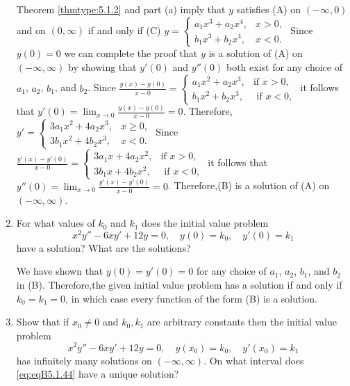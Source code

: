 \documentclass{ximera}
\begin{document}
\begin{problem}
\begin{enumerate}
\begin{solution}
    Theorem \ref{thmtype:5.1.2} and part (a) imply that $y$ satisfies (A) on
$(-\infty,0)$ and on $(0,\infty)$ if and only if
(C) $y=\left\{\begin{array}{rr}
a_1x^3+a_2x^4,&x> 0,\\
b_1x^3+b_2x^4,&x<0.
\end{array}\right.$
Since $y(0)=0$ we can  complete the proof that $y$ is
a solution of
(A) on $(-\infty,\infty)$ by showing
that $y'(0)$ and $y''(0)$ both exist for any choice of $a_1$, $a_2$,
$b_1$, and $b_2$. Since
$\frac{y(x)-y(0)}{
x-0}=\left\{\begin{array}{cl}a_1x^2+a_2x^3,&\mbox{
if }x>0,\\ b_1x^2+b_2x^3,&\mbox{ if }x<0,\end{array}\right.$ it
follows
that $y'(0)=\lim_{x\to0}\frac{y(x)-y(0)}{ x-0}=0$. Therefore,
$y'=\left\{\begin{array}{rr}
3a_1x^2+4a_2x^3,&x\ge 0,\\
3b_1x^2+4b_2x^3,&x<0.
\end{array}\right.$
Since
$\frac{y'(x)-y'(0)}{
x-0}=\left\{\begin{array}{cl}3a_1x+4a_2x^2,&\mbox{
if }x>0,\\ 3b_1x+4b_2x^2,&\mbox{ if }x<0,\end{array}\right.$ it
follows that $y''(0)=\lim_{x\to0}\frac{y'(x)-y'(0)}{ x-0}=0$.
Therefore,(B) is a solution of (A) on $(-\infty,\infty)$.
\end{solution}
\item %
 For what values of $k_0$ and  $k_1$
does the initial value problem
$$
x^2y''-6xy'+12y=0, \quad  y(0)=k_0,\quad y'(0)=k_1
$$
have a solution? What are the solutions?

\begin{solution}
    We have shown that $y(0)=y'(0)=0$ for any choice
of $a_1$, $a_2$, $b_1$, and $b_2$ in (B). Therefore,the given initial
value
problem has a solution if and only if $k_0=k_1=0$, in which case every
function of the form (B) is a solution.
\end{solution}
\item %
 Show that if $x_0\ne0$ and $k_0,k_1$  are
arbitrary constants then the initial value problem
\begin{equation}\label{eq:eqB5.1.44}
x^2y''-6xy'+12y=0, \quad  y(x_0)=k_0,\quad y'(x_0)=k_1
\end{equation}
has infinitely many solutions on $(-\infty,\infty)$.  On what interval does
\ref{eq:eqB5.1.44} have a unique solution?


\end{enumerate}
\end{problem}
\end{document}
